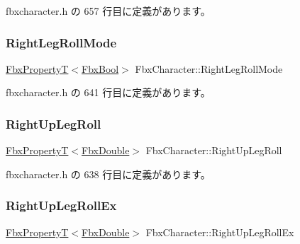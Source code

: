  fbxcharacter.\+h の 657 行目に定義があります。

\mbox{\label{class_fbx_character_ad8adb21239c56498bd85e983931c825b}} 
\subsubsection{\texorpdfstring{Right\+Leg\+Roll\+Mode}{RightLegRollMode}}
{\footnotesize\ttfamily \hyperlink{class_fbx_property_t}{Fbx\+PropertyT}$<$\hyperlink{fbxtypes_8h_a92e0562b2fe33e76a242f498b362262e}{Fbx\+Bool}$>$ Fbx\+Character\+::\+Right\+Leg\+Roll\+Mode}



 fbxcharacter.\+h の 641 行目に定義があります。

\mbox{\label{class_fbx_character_a32c6ee078b478ecc10b0c021b515db26}} 
\subsubsection{\texorpdfstring{Right\+Up\+Leg\+Roll}{RightUpLegRoll}}
{\footnotesize\ttfamily \hyperlink{class_fbx_property_t}{Fbx\+PropertyT}$<$\hyperlink{fbxtypes_8h_a171e72a1c46fc15c1a6c9c31948c1c5b}{Fbx\+Double}$>$ Fbx\+Character\+::\+Right\+Up\+Leg\+Roll}



 fbxcharacter.\+h の 638 行目に定義があります。

\mbox{\label{class_fbx_character_a5329916e950ff24a4280efc89cf27929}} 
\subsubsection{\texorpdfstring{Right\+Up\+Leg\+Roll\+Ex}{RightUpLegRollEx}}
{\footnotesize\ttfamily \hyperlink{class_fbx_property_t}{Fbx\+PropertyT}$<$\hyperlink{fbxtypes_8h_a171e72a1c46fc15c1a6c9c31948c1c5b}{Fbx\+Double}$>$ Fbx\+Character\+::\+Right\+Up\+Leg\+Roll\+Ex}



